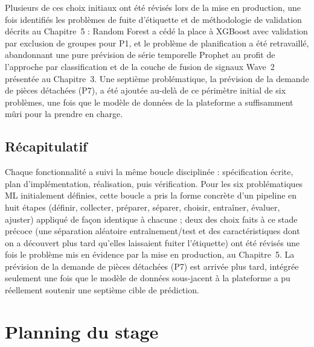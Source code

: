 Plusieurs de ces choix initiaux ont été révisés lors de la mise en production, une fois identifiés les problèmes de fuite d'étiquette et de méthodologie de validation décrits au Chapitre~5 : Random Forest a cédé la place à XGBoost avec validation par exclusion de groupes pour P1, et le problème de planification a été retravaillé, abandonnant une pure prévision de série temporelle Prophet au profit de l'approche par classification et de la couche de fusion de signaux Wave~2 présentée au Chapitre~3. Une septième problématique, la prévision de la demande de pièces détachées (P7), a été ajoutée au-delà de ce périmètre initial de six problèmes, une fois que le modèle de données de la plateforme a suffisamment mûri pour la prendre en charge.

\subsection{Récapitulatif}

Chaque fonctionnalité a suivi la même boucle disciplinée : spécification écrite, plan d'implémentation, réalisation, puis vérification. Pour les six problématiques ML initialement définies, cette boucle a pris la forme concrète d'un pipeline en huit étapes (définir, collecter, préparer, séparer, choisir, entraîner, évaluer, ajuster) appliqué de façon identique à chacune ; deux des choix faits à ce stade précoce (une séparation aléatoire entraînement/test et des caractéristiques dont on a découvert plus tard qu'elles laissaient fuiter l'étiquette) ont été révisés une fois le problème mis en évidence par la mise en production, au Chapitre~5. La prévision de la demande de pièces détachées (P7) est arrivée plus tard, intégrée seulement une fois que le modèle de données sous-jacent à la plateforme a pu réellement soutenir une septième cible de prédiction.

\section{Planning du stage}


